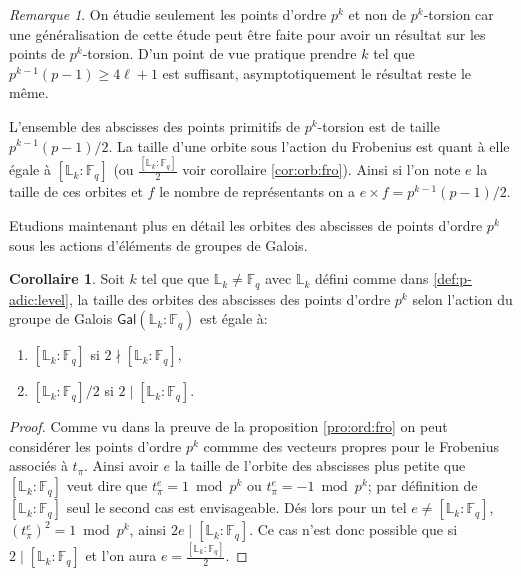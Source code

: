\documentclass[10pt,a4paper]{book}
\theoremstyle{plain}
\theoremstyle{definition}
\theoremstyle{definition}
\newtheorem{cor}[thm]{Corollaire}
\theoremstyle{definition}
\theoremstyle{definition}
\theoremstyle{remark}
\newtheorem{rem}[thm]{Remarque}
\theoremstyle{remark}
\theoremstyle{definition}
\begin{document}
\begin{rem}
On étudie seulement les points d'ordre $p^k$ et non de $p^k$-torsion car une 
généralisation de cette étude peut être faite pour avoir un résultat sur les 
points de $p^k$-torsion. D'un point de vue pratique prendre $k$ tel que 
$p^{k-1}(p-1) \geqslant 4 \ell +1$ est suffisant, asymptotiquement le résultat 
reste le même.
\end{rem}

L'ensemble des abscisses des points primitifs de $p^k$-torsion est de taille 
$p^{k-1}(p-1)/2$. La taille d'une orbite sous l'action du Frobenius est quant à
elle égale à $[\mathbb{L}_k:\mathbb{F}_q]$ (ou 
$\frac{[\mathbb{L}_k:\mathbb{F}_q]}{2}$ voir corollaire \ref{cor:orb:fro}). 
Ainsi si l'on note $e$ la taille de ces orbites et $f$ le nombre de 
représentants on a $e \times f=p^{k-1}(p-1)/2$.

Etudions maintenant plus en détail les orbites des abscisses de points d'ordre $p^k$ sous les actions d'éléments de groupes de Galois.

\begin{cor}
\label{cor:tai:orb}
Soit $k$ tel que que $\mathbb{L}_k \neq \mathbb{F}_q$ avec $\mathbb{L}_k$ défini comme dans \ref{def:p-adic:level}, 
la taille des orbites des abscisses des points d'ordre $p^k$ selon l'action du groupe de Galois $\mathsf{Gal}(\mathbb{L}_k:\mathbb{F}_q)$  est égale à:
\begin{enumerate} 
\item $[\mathbb{L}_k:\mathbb{F}_q]$ si $2 \nmid [\mathbb{L}_k:\mathbb{F}_q]$,
\item $[\mathbb{L}_k:\mathbb{F}_q]/2$ si $2 \mid [\mathbb{L}_k:\mathbb{F}_q]$.
\end{enumerate}
\end{cor}

\begin{proof}
Comme vu dans la preuve de la proposition \ref{pro:ord:fro} on peut considérer les points d'ordre $p^k$ commme des vecteurs propres pour le Frobenius associés à $t_{\pi}$. Ainsi avoir $e$ la taille de l'orbite des abscisses plus petite que  $[\mathbb{L}_k:\mathbb{F}_q]$ veut dire que $t_{\pi}^e=1 \bmod p^k$ ou $t_{\pi}^e=-1 \bmod p^k$; par définition de $[\mathbb{L}_k:\mathbb{F}_q]$ seul le second cas est envisageable. Dés lors pour un tel $e \neq [\mathbb{L}_k:\mathbb{F}_q]$,  $(t_{\pi}^{e})^2=1 \bmod p^k$, ainsi $2e \mid [\mathbb{L}_k:\mathbb{F}_q]$. Ce cas n'est donc possible que si $2 \mid [\mathbb{L}_k:\mathbb{F}_q]$ et l'on aura $e= \frac{[\mathbb{L}_k:\mathbb{F}_q]}{2}$. 
\end{proof}
\end{document}
